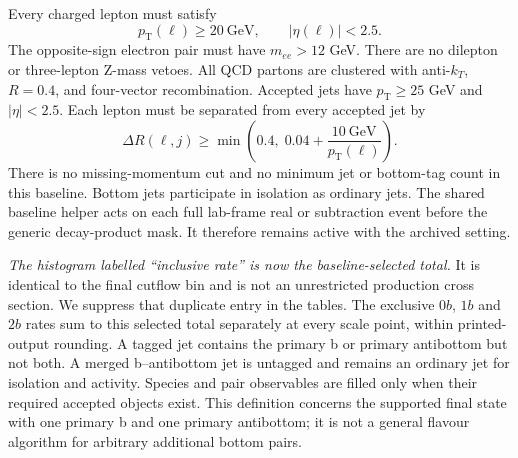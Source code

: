 \documentclass[11pt,a4paper]{article}
\newcommand{\pt}{p_{\mathrm T}}
\newcommand{\code}[1]{\texttt{\detokenize{#1}}}
\begin{document}
Every charged lepton must satisfy
\begin{equation}
 \pt(\ell)\geq20~\mathrm{GeV},\qquad |\eta(\ell)|<2.5.
\end{equation}
The opposite-sign electron pair must have $m_{ee}>12$ GeV. There are no
dilepton or three-lepton Z-mass vetoes. All QCD partons are clustered
with anti-$k_T$, $R=0.4$, and four-vector recombination. Accepted jets
have $\pt\geq25$ GeV and $|\eta|<2.5$. Each lepton must be separated
from every accepted jet by
\begin{equation}
 \Delta R(\ell,j)\geq
 \min\!\left(0.4,\;0.04+\frac{10~\mathrm{GeV}}{\pt(\ell)}\right).
\end{equation}
There is no missing-momentum cut and no minimum jet or bottom-tag count
in this baseline. Bottom jets participate in isolation as ordinary jets.
The shared baseline helper acts on each full lab-frame real or
subtraction event before the generic decay-product mask. It therefore
remains active with the archived \code{cut_decays=False} setting.

\emph{The histogram labelled ``inclusive rate'' is now the
baseline-selected total.} It is identical to the final cutflow bin and
is not an unrestricted production cross section. We suppress that
duplicate entry in the tables. The exclusive $0b$, $1b$ and $2b$ rates
sum to this selected total separately at every scale point, within
printed-output rounding. A tagged jet contains the primary b or primary
antibottom but not both. A merged b--antibottom jet is untagged and
remains an ordinary jet for isolation and activity. Species and pair
observables are filled only when their required accepted objects exist.
This definition concerns the supported final state with one primary b
and one primary antibottom; it is not a general flavour algorithm for
arbitrary additional bottom pairs.
\end{document}
